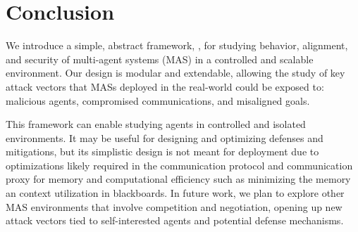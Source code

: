 \section{Conclusion}
We introduce a simple, abstract framework, \sys, for studying behavior, alignment, and security of multi-agent systems (MAS) in a controlled and scalable environment. Our design is modular and extendable, allowing the study of key attack vectors that 
MASs deployed in the real-world could be exposed to: malicious agents, compromised communications, and misaligned goals. 

This framework can enable studying agents in controlled and isolated environments. It may be useful for designing and optimizing defenses and mitigations, but its simplistic design is not meant for deployment due to optimizations likely required in the communication protocol and communication proxy for memory and computational efficiency such as minimizing the memory an context utilization in blackboards. In future work, we plan to explore other MAS environments that involve competition and negotiation, opening up new attack vectors tied to self-interested agents and potential defense mechanisms.
